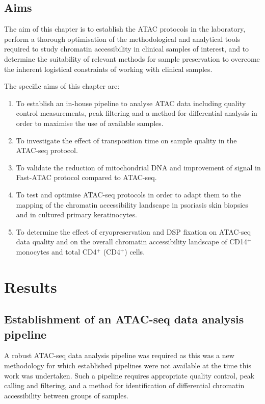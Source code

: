 \subsection{Aims}

The aim of this chapter is to establish the ATAC protocols in the laboratory, perform a thorough optimisation of the methodological and analytical tools required to study chromatin accessibility in clinical samples of interest, and to determine the suitability of relevant methods for sample preservation to overcome the inherent logistical constraints of working with clinical samples.
 
The specific aims of this chapter are:
 
\begin{enumerate}
\item To establish an in-house pipeline to analyse ATAC data including quality control measurements, peak filtering and a method for differential analysis in order to maximise the use of available samples.
 
\item To investigate the effect of transposition time on sample quality in the ATAC-seq protocol.
 
\item To validate the reduction of mitochondrial DNA and improvement of signal in Fast-ATAC protocol compared to ATAC-seq.
 
\item To test and optimise ATAC-seq protocols in order to adapt them to the mapping of the chromatin accessibility landscape in psoriasis skin biopsies and in cultured primary keratinocytes.

\item To determine the effect of cryopreservation and DSP fixation on ATAC-seq data quality and on the overall chromatin accessibility landscape of CD14$^+$ monocytes and total CD4$^+$ (CD4$^+$) cells.
\end{enumerate}



\section{Results}
%

\subsection{Establishment of an ATAC-seq data analysis pipeline}
A robust ATAC-seq data analysis pipeline was required as this was a new methodology \parencite{Buenrostro2013} for which established pipelines were not available at the time this work was undertaken. Such a pipeline requires appropriate quality control, peak calling and filtering, and a method for identification of differential chromatin accessibility between groups of samples. 

